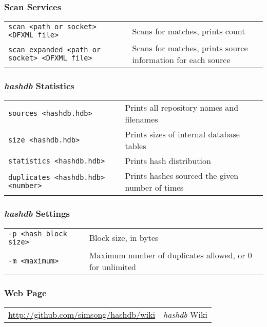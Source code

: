\documentclass[12pt]{article}
\newcommand{\hdb}{\emph{hashdb}\xspace}
\begin{document}
\subsubsection*{Scan Services}
\begin{tabular}{p{8 cm} p{9 cm} }
\texttt{scan <path or socket> <DFXML file>} & Scans for matches, prints count\\
\texttt{scan\_expanded <path or socket> <DFXML file>} & Scans for matches, prints source information for each source \\
\end{tabular}

\subsubsection*{\hdb Statistics}
\begin{tabular}{p{8 cm} p{9 cm} }
\texttt{sources <hashdb.hdb>} & Prints all repository names and filenames \\
\texttt{size <hashdb.hdb>} & Prints sizes of internal database tables \\
\texttt{statistics <hashdb.hdb>} & Prints hash distribution \\
\texttt{duplicates <hashdb.hdb> <number>} & Prints hashes sourced the given number of times \\
\end{tabular}

\subsubsection*{\hdb Settings}
\begin{tabular}{p{8 cm} p{9 cm} }
\texttt{-p <hash block size>} & Block size, in bytes \\
\texttt{-m <maximum>} & Maximum number of duplicates allowed, or 0 for unlimited\\
\end{tabular}

\subsubsection*{Web Page}
\begin{tabular}{p{8 cm} p{9 cm} }
\url{http://github.com/simsong/hashdb/wiki} & \hdb Wiki \\
\end{tabular}
\end{document}
